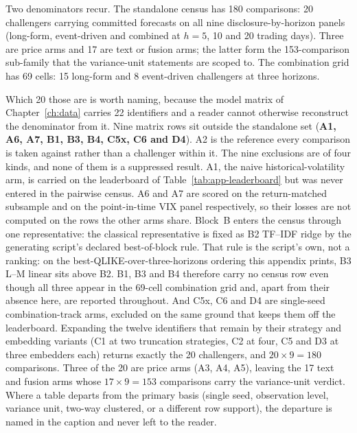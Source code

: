 Two denominators recur. The standalone census has 180 comparisons: 20
challengers carrying committed forecasts on all nine disclosure-by-horizon
panels (long-form, event-driven and combined at $h = 5$, 10 and 20
trading days). Three are price arms and 17 are text or fusion
arms; the latter form the 153-comparison sub-family that the
variance-unit statements are scoped to. The combination grid has 69
cells: 15 long-form and 8 event-driven challengers at three horizons.

Which 20 those are is worth naming, because the model matrix of
Chapter~\ref{ch:data} carries 22 identifiers and a reader cannot
otherwise reconstruct the denominator from it. Nine matrix rows sit
outside the standalone set (\textbf{A1, A6, A7, B1, B3, B4, C5x, C6
and D4}). A2 is the reference every comparison is taken against
rather than a challenger within it. %
The nine exclusions are of four kinds, and none of them is a suppressed
result. A1, the naive historical-volatility arm, is carried on the
leaderboard of Table~\ref{tab:app-leaderboard} but was never entered in
the pairwise census. A6 and A7 are scored on the return-matched
subsample and on the point-in-time VIX panel respectively, so their
losses are not computed on the rows the other arms share. Block~B enters
the census through one representative: the classical
representative is fixed as B2 TF--IDF ridge by the generating script's
declared best-of-block rule. That rule is the script's own, not a ranking:
on the best-QLIKE-over-three-horizons ordering this appendix prints, B3
L--M linear sits above B2. %
B1, B3 and B4 therefore carry no census row even
though all three appear in the 69-cell combination grid and, apart from
their absence here, are reported throughout.
And C5x, C6 and D4 are single-seed combination-track arms, excluded on
the same ground that keeps them off the leaderboard.
Expanding the twelve identifiers that remain by their strategy and
embedding variants (C1 at two truncation strategies, C2 at four, C5
and D3 at three embedders each) returns exactly the 20 challengers,
and $20 \times 9 = 180$ comparisons. Three of the 20 are price arms
(A3, A4, A5), leaving the 17 text and fusion arms whose $17 \times 9 =
153$ comparisons carry the variance-unit verdict.
Where a table departs from the primary basis (single seed, observation
level, variance unit, two-way clustered, or a different row support),
the departure is named in the caption and never left to the reader.

